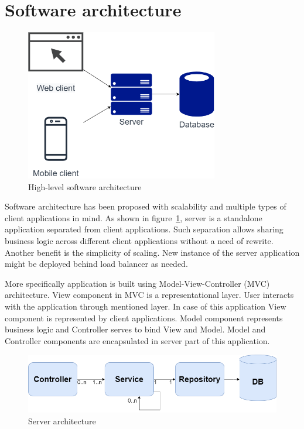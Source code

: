 
\section{Software architecture}\label{sec:software-architecture}

\begin{figure}[h!]
    \includegraphics[width=0.75\textwidth]{images/high-level-architecture}
    \caption{High-level software architecture}
    \label{fig:high-level-architecture}
\end{figure}

Software architecture has been proposed with scalability and multiple types of client applications in mind.
As shown in figure~\ref{fig:high-level-architecture}, server is a standalone application separated from client applications.
Such separation allows sharing business logic across different client applications without a need of rewrite.
Another benefit is the simplicity of scaling.
New instance of the server application might be deployed behind load balancer as needed.

More specifically application is built using Model-View-Controller (MVC) architecture.\cite{wiki-mvc}
View component in MVC is a representational layer.
User interacts with the application through mentioned layer.
In case of this application View component is represented by client applications.
Model component represents business logic and Controller serves to bind View and Model.
Model and Controller components are encapsulated in server part of this application.

\begin{figure}[h!]
    \includegraphics[width=1\textwidth]{images/server-mvc-spring}
    \caption{Server architecture}
    \label{fig:server-mvc-spring}
\end{figure}

